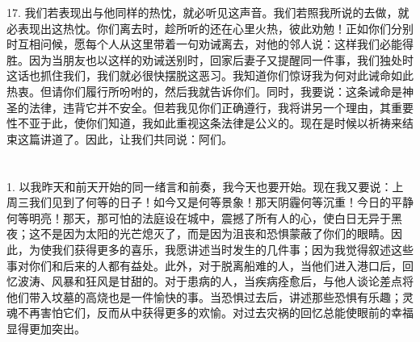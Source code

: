 17. 我们若表现出与他同样的热忱，就必听见这声音。我们若照我所说的去做，就必表现出这热忱。你们离去时，趁所听的还在心里火热，彼此劝勉！正如你们分别时互相问候，愿每个人从这里带着一句劝诫离去，对他的邻人说：这样我们必能得胜。因为当朋友也以这样的劝诫送别时，回家后妻子又提醒同一件事，我们独处时这话也抓住我们，我们就必很快摆脱这恶习。我知道你们惊讶我为何对此诫命如此热衷。但请你们履行所吩咐的，然后我就告诉你们。同时，我要说：这条诫命是神圣的法律，违背它并不安全。但若我见你们正确遵行，我将讲另一个理由，其重要性不亚于此，使你们知道，我如此重视这条法律是公义的。现在是时候以祈祷来结束这篇讲道了。因此，让我们共同说：阿们。\par



\section{}

\par

1. 以我昨天和前天开始的同一绪言和前奏，我今天也要开始。现在我又要说：上周三我们见到了何等的日子！如今又是何等景象！那天阴霾何等沉重！今日的平静何等明亮！那天，那可怕的法庭设在城中，震撼了所有人的心，使白日无异于黑夜；这不是因为太阳的光芒熄灭了，而是因为沮丧和恐惧蒙蔽了你们的眼睛。因此，为使我们获得更多的喜乐，我愿讲述当时发生的几件事；因为我觉得叙述这些事对你们和后来的人都有益处。此外，对于脱离船难的人，当他们进入港口后，回忆波涛、风暴和狂风是甘甜的。对于患病的人，当疾病痊愈后，与他人谈论差点将他们带入坟墓的高烧也是一件愉快的事。当恐惧过去后，讲述那些恐惧有乐趣；灵魂不再害怕它们，反而从中获得更多的欢愉。对过去灾祸的回忆总能使眼前的幸福显得更加突出。\par

